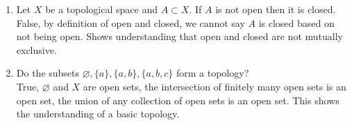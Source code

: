 \documentclass[12pt]{article}
\newcommand{\1}{^{-1}}
\begin{document}
\begin{enumerate}
		\item  Let $X$ be a topological space and $ A\subset X $. If $ A $ is not open then it is closed.\\
		False, by definition of open and closed, we cannot say $ A $ is closed based on not being open. Shows understanding that open and closed are not mutually exclusive.
		\item Do the subsets $ \varnothing,\{a\},\{a,b\},\{a,b,c\} $ form a topology?\\
		True, $ \varnothing $ and $ X $ are open sets, the intersection of finitely many open sets is an open set, the union of any collection of open sets is an open set. This shows the understanding of a basic topology.
		
	\end{enumerate}
	
	
	
	
	
	
	
	
	
	
	
	
	
	
	
	
	
	
	
	
	
	
	
\end{document}
